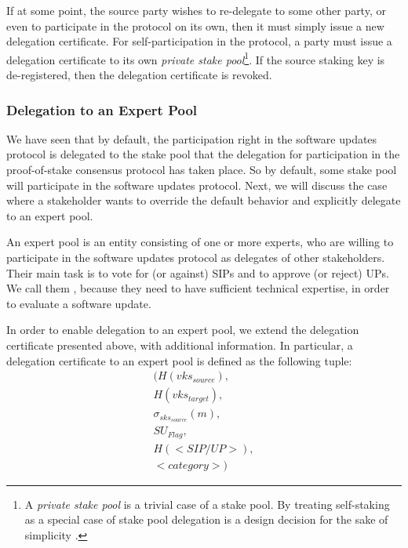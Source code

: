 If at some point, the source party wishes to re-delegate to some other party, or
even to participate in the protocol on its own, then it must simply issue a new
delegation certificate. For self-participation in the protocol, a party must
issue a delegation certificate to its own \emph{private stake pool}\footnote{A
  \emph{private stake pool} is a trivial case of a stake pool. By treating
  self-staking as a special case of stake pool delegation is a design decision
  for the sake of simplicity \cite{deldesign}.}. If the source staking key is
de-registered, then the delegation certificate is revoked.

\subsubsection*{Delegation to an Expert Pool}
We have seen that by default, the participation right in the software updates
protocol is delegated to the stake pool that the delegation for participation in
the proof-of-stake consensus protocol has taken place. So by default, some stake
pool will participate in the software updates protocol. Next, we will discuss
the case where a stakeholder wants to override the default behavior and
explicitly delegate to an expert pool.

An expert pool is an entity consisting of one or more experts, who are willing
to participate in the software updates protocol as delegates of other
stakeholders. Their main task is to vote for (or against) SIPs and to approve
(or reject) UPs. We call them , because they need to have
sufficient technical expertise, in order to evaluate a software update.

In order to enable delegation to an expert pool, we extend the delegation
certificate presented above, with additional information. In particular, a
delegation certificate to an expert pool is defined as the following tuple:
\begin{align*}
(H(vks_{source}), \\
 H(vks_{target}), \\
 \sigma_{sks_{source}}(m), \\
 SU_{Flag}, \\
 H(<SIP/UP>), \\
 <category>)
\end{align*}

